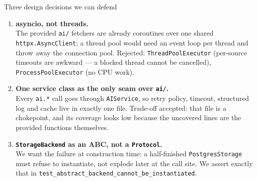 \documentclass[aspectratio=169,11pt]{beamer}
\begin{document}
\begin{frame}{Three design decisions we can defend}
  \begin{enumerate}\setlength\itemsep{0.55em}
    \item \textbf{asyncio, not threads.}\\
      {\small The provided \texttt{ai/} fetchers are already coroutines over one shared
      \texttt{httpx.AsyncClient}; a thread pool would need an event loop per thread and throw
      away the connection pool. Rejected: \texttt{ThreadPoolExecutor} (per-source timeouts are
      awkward --- a blocked thread cannot be cancelled), \texttt{ProcessPoolExecutor} (no CPU work).}
    \item \textbf{One service class as the only seam over \texttt{ai/}.}\\
      {\small Every \texttt{ai.*} call goes through \texttt{AIService}, so retry policy, timeout,
      structured log and cache live in exactly one file. Trade-off accepted: that file is a
      chokepoint, and its coverage looks low because the uncovered lines are the provided
      functions themselves.}
    \item \textbf{\texttt{StorageBackend} as an ABC, not a \texttt{Protocol}.}\\
      {\small We want the failure at construction time: a half-finished \texttt{PostgresStorage}
      must refuse to instantiate, not explode later at the call site. We assert exactly that in
      \texttt{test\_abstract\_backend\_cannot\_be\_instantiated}.}
  \end{enumerate}
\end{frame}
\end{document}
